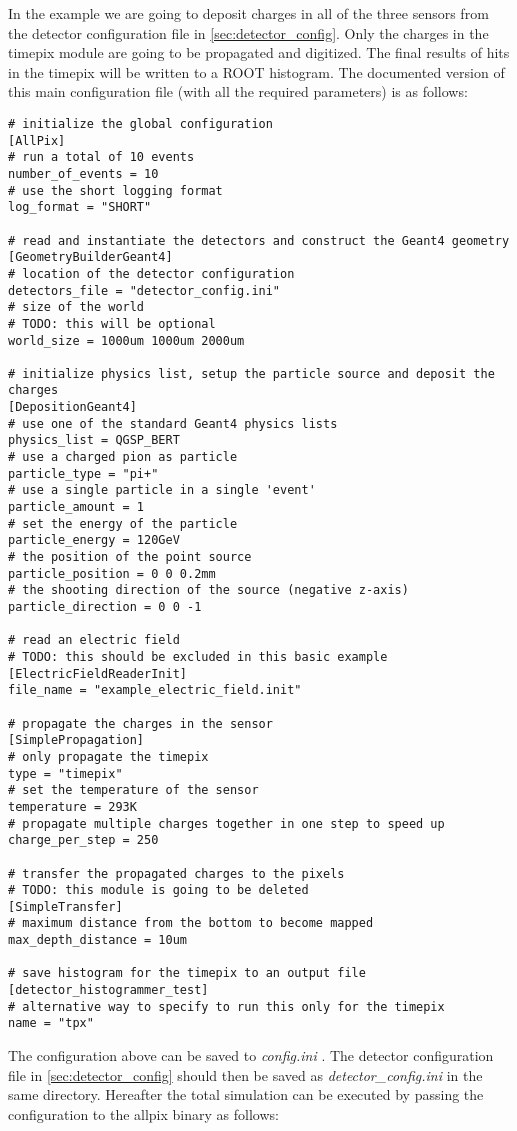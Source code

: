In the example we are going to deposit charges in all of the three sensors from the detector configuration file in \ref{sec:detector_config}. Only the charges in the timepix module are going to be propagated and digitized. The final results of hits in the timepix will be written to a ROOT histogram. The documented version of this main configuration file (with all the required parameters) is as follows:
\begin{verbatim}
# initialize the global configuration
[AllPix]
# run a total of 10 events
number_of_events = 10
# use the short logging format
log_format = "SHORT"

# read and instantiate the detectors and construct the Geant4 geometry
[GeometryBuilderGeant4]
# location of the detector configuration
detectors_file = "detector_config.ini"
# size of the world 
# TODO: this will be optional
world_size = 1000um 1000um 2000um

# initialize physics list, setup the particle source and deposit the charges
[DepositionGeant4]
# use one of the standard Geant4 physics lists
physics_list = QGSP_BERT
# use a charged pion as particle
particle_type = "pi+"
# use a single particle in a single 'event'
particle_amount = 1 
# set the energy of the particle 
particle_energy = 120GeV
# the position of the point source
particle_position = 0 0 0.2mm
# the shooting direction of the source (negative z-axis)
particle_direction = 0 0 -1

# read an electric field
# TODO: this should be excluded in this basic example
[ElectricFieldReaderInit]
file_name = "example_electric_field.init"

# propagate the charges in the sensor 
[SimplePropagation]
# only propagate the timepix
type = "timepix"
# set the temperature of the sensor
temperature = 293K
# propagate multiple charges together in one step to speed up
charge_per_step = 250

# transfer the propagated charges to the pixels
# TODO: this module is going to be deleted
[SimpleTransfer]
# maximum distance from the bottom to become mapped
max_depth_distance = 10um 

# save histogram for the timepix to an output file
[detector_histogrammer_test]
# alternative way to specify to run this only for the timepix
name = "tpx"
\end{verbatim}

The configuration above can be saved to \textit{config.ini} . The detector configuration file in \ref{sec:detector_config} should then be saved as \textit{detector\_config.ini} in the same directory. Hereafter the total simulation can be executed by passing the configuration to the allpix binary as follows:

